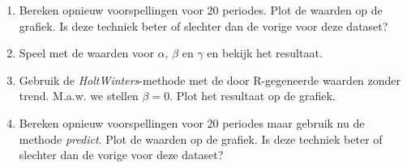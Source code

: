 \begin{exercise}
\begin{enumerate}
  \item Bereken opnieuw voorspellingen voor 20 periodes. Plot de waarden op de grafiek. Is deze techniek beter of slechter dan de vorige voor deze dataset?
  \item Speel met de waarden voor $\alpha$, $\beta$ en $\gamma$ en bekijk het resultaat.
  \item Gebruik de \emph{HoltWinters}-methode met de door R-gegeneerde waarden zonder trend.  M.a.w. we stellen $\beta=0$.  Plot het resultaat op de grafiek.
  \item Bereken opnieuw voorspellingen voor 20 periodes maar gebruik nu de methode \emph{predict}. Plot de waarden op de grafiek. Is deze techniek beter of slechter dan de vorige voor deze dataset?
\end{enumerate}	
\end{exercise}

